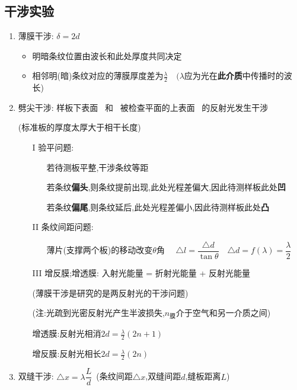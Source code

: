 \documentclass{article}
\begin{document}
\subsection{干涉实验}
\begin{enumerate}[label = (\arabic*{})]
    \item 薄膜干涉: $\delta = 2d$
          \begin{itemize}
              \item 明暗条纹位置由波长和此处厚度共同决定
              \item 相邻明(暗)条纹对应的薄膜厚度差为$\frac{\lambda}{2} \quad (\lambda$应为光在\textbf{此介质}中传播时的波长)
          \end{itemize}
    \item 劈尖干涉: 样板下表面 \, 和 \, 被检查平面的上表面 \, 的反射光发生干涉

          \hspace{5em}(标准板的厚度太厚大于相干长度)

          \begin{itemize}
              \item[I] 验平问题:
                  \begin{itemize}
                      \item[] 若待测板平整,干涉条纹等距
                      \item[] 若条纹\textbf{偏头},则条纹提前出现,此处光程差偏大,因此待测样板此处\textbf{凹}
                      \item[] 若条纹\textbf{偏尾},则条纹延后,此处光程差偏小,因此待测样板此处\textbf{凸}
                  \end{itemize}
              \item[II] 条纹间距问题:
                  \begin{itemize}
                      \item[] 薄片(支撑两个板)的移动改变$\theta$角 $\quad \triangle l = \dfrac{\triangle d}{\tan{\theta}} \quad
                              \triangle d = f(\lambda) = \dfrac{\lambda}{2}$
                  \end{itemize}
              \item[III] 增反膜;增透膜: 入射光能量 = 折射光能量 + 反射光能量
                  
                  \hspace{4em}(薄膜干涉是研究的是两反射光的干涉问题)

                  \hspace{4em}(注:光疏到光密反射光产生半波损失,$n_{\text{膜}}$介于空气和另一介质之间)

                  \hspace{4em}增透膜:反射光相消$2d = \frac{\lambda}{2} (2n+1)$

                  \hspace{4em}增反膜:反射光相长$2d = \frac{\lambda}{2} (2n) $
          \end{itemize}

    \item 双缝干涉: $\triangle x = \lambda \dfrac{L}{d} \,$ (条纹间距$\triangle x $,双缝间距$d$,缝板距离$L$)
\end{enumerate}
\end{document}
